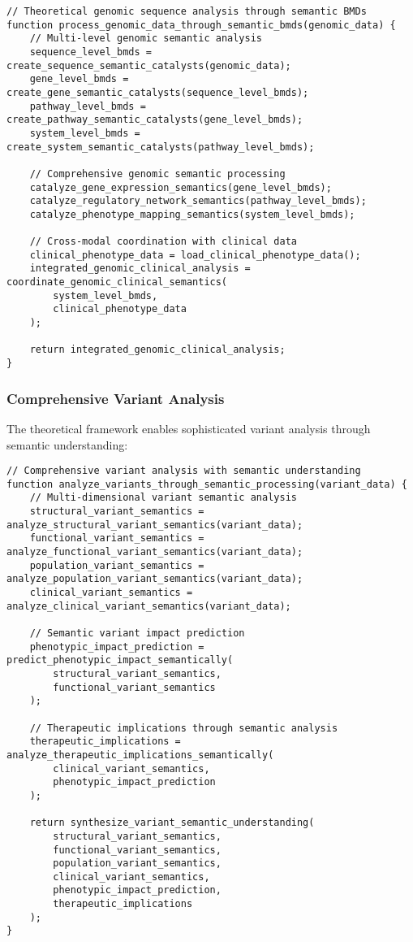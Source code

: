 \documentclass[12pt,a4paper,twoside]{article}
\begin{document}
\begin{lstlisting}[caption=Comprehensive Genomic Information Catalysis]
// Theoretical genomic sequence analysis through semantic BMDs
function process_genomic_data_through_semantic_bmds(genomic_data) {
    // Multi-level genomic semantic analysis
    sequence_level_bmds = create_sequence_semantic_catalysts(genomic_data);
    gene_level_bmds = create_gene_semantic_catalysts(sequence_level_bmds);
    pathway_level_bmds = create_pathway_semantic_catalysts(gene_level_bmds);
    system_level_bmds = create_system_semantic_catalysts(pathway_level_bmds);

    // Comprehensive genomic semantic processing
    catalyze_gene_expression_semantics(gene_level_bmds);
    catalyze_regulatory_network_semantics(pathway_level_bmds);
    catalyze_phenotype_mapping_semantics(system_level_bmds);

    // Cross-modal coordination with clinical data
    clinical_phenotype_data = load_clinical_phenotype_data();
    integrated_genomic_clinical_analysis = coordinate_genomic_clinical_semantics(
        system_level_bmds,
        clinical_phenotype_data
    );

    return integrated_genomic_clinical_analysis;
}
\end{lstlisting}

\subsubsection{Comprehensive Variant Analysis}

The theoretical framework enables sophisticated variant analysis through semantic understanding:

\begin{lstlisting}[caption=Theoretical Variant Analysis Through Semantic Processing]
// Comprehensive variant analysis with semantic understanding
function analyze_variants_through_semantic_processing(variant_data) {
    // Multi-dimensional variant semantic analysis
    structural_variant_semantics = analyze_structural_variant_semantics(variant_data);
    functional_variant_semantics = analyze_functional_variant_semantics(variant_data);
    population_variant_semantics = analyze_population_variant_semantics(variant_data);
    clinical_variant_semantics = analyze_clinical_variant_semantics(variant_data);

    // Semantic variant impact prediction
    phenotypic_impact_prediction = predict_phenotypic_impact_semantically(
        structural_variant_semantics,
        functional_variant_semantics
    );

    // Therapeutic implications through semantic analysis
    therapeutic_implications = analyze_therapeutic_implications_semantically(
        clinical_variant_semantics,
        phenotypic_impact_prediction
    );

    return synthesize_variant_semantic_understanding(
        structural_variant_semantics,
        functional_variant_semantics,
        population_variant_semantics,
        clinical_variant_semantics,
        phenotypic_impact_prediction,
        therapeutic_implications
    );
}
\end{lstlisting}
\end{document}
